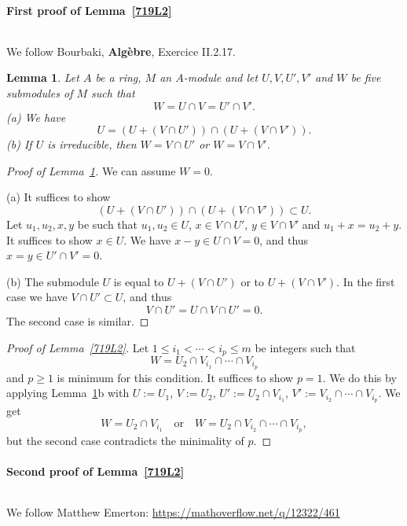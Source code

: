 \documentclass[parskip=half,fontsize=12pt]{scrartcl}%
\newtheorem{lem}[thm]{Lemma}
\begin{document}
\paragraph{First proof of Lemma~\ref{719L2}}${}$\medskip%

We follow Bourbaki, \textbf{Algèbre}, Exercice II.2.17.

\begin{lem}\label{719L3}
Let $A$ be a ring, $M$ an $A$-module and let $U,V,U',V'$ and $W$ be five submodules of $M$ such that 
$$
W=U\cap V=U'\cap V'.
$$ 
(a) We have 
$$
U=(U+(V\cap U'))\cap(U+(V\cap V')).
$$ 
(b) If $U$ is irreducible, then $W=V\cap U'$ or $W=V\cap V'$. 
\end{lem} 
\begin{proof}[Proof of Lemma~\ref{719L3}] We can assume $W=0$. 

(a) It suffices to show 
$$
(U+(V\cap U'))\cap(U+(V\cap V'))\subset U. 
$$ 
Let $u_1,u_2,x,y$ be such that $u_1,u_2\in U$, $x\in V\cap U'$, $y\in V\cap V'$ and $u_1+x=u_2+y$. It suffices to show $x\in U$. We have $x-y\in U\cap V=0$, and thus $x=y\in U'\cap V'=0$. 

(b) The submodule $U$ is equal to $U+(V\cap U')$ or to $U+(V\cap V')$. In the first case we have $V\cap U'\subset U$, and thus 
$$
V\cap U'=U\cap V\cap U'=0. 
$$ 
The second case is similar. 
\end{proof} 

\begin{proof}[Proof of Lemma~\ref{719L2}] Let $1\le i_1<\cdots<i_p\le m$ be integers such that 
$$
W=U_2\cap V_{i_1}\cap\cdots\cap V_{i_p}
$$ 
and $p\ge1$ is minimum for this condition. It suffices to show $p=1$. We do this by applying Lemma~\ref{719L3}b with $U:=U_1$, $V:=U_2$, $U':=U_2\cap V_{i_1}$, $V':=V_{i_2}\cap\cdots\cap V_{i_p}$. We get %
$$
W=U_2\cap V_{i_1}\quad\text{or}\quad W=U_2\cap V_{i_2}\cap\cdots\cap V_{i_p},
$$ 
but the second case contradicts the minimality of $p$.
\end{proof}

\paragraph{Second proof of Lemma~\ref{719L2}}${}$\medskip%

We follow Matthew Emerton: \href{https://mathoverflow.net/q/12322/461}{https://mathoverflow.net/q/12322/461}%
\end{document}
